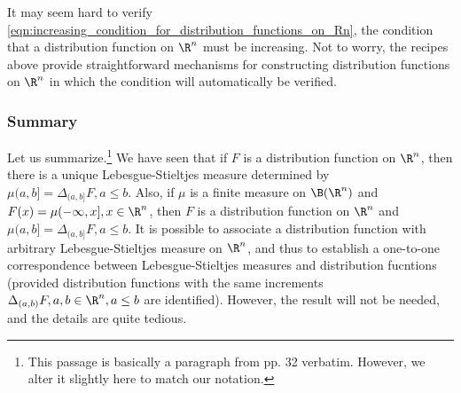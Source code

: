 \documentclass{article} %
\begin{document}

\begin{remark}

It may seem hard to verify \eqref{eqn:increasing_condition_for_distribution_functions_on_Rn}, the condition that a distribution function on $\R^n$ must be increasing.  Not to worry, the recipes above provide straightforward mechanisms for constructing distribution functions on $\R^n$ in which the condition will automatically be verified.
\end{remark}

\subsubsection{Summary}

Let us summarize.\footnote{This passage is basically a paragraph from \cite{ash2000probability} pp. 32 verbatim. However, we alter it slightly here to match our notation.} We have seen that if $F$ is a distribution function on $\R^n$, then there is a unique Lebesgue-Stieltjes measure determined by $\mu(a,b] = \Delta_{(a,b]} F, a \leq b$.  Also, if $\mu$ is a finite measure on $\B(\R^n)$ and $F(x) = \mu(-\infty, x], x \in \R^n$, then $F$ is a distribution function on $\R^n$ and $\mu(a,b] =  \Delta_{(a,b]} F, a \leq b$.   It is possible to associate a distribution function with arbitrary Lebesgue-Stieltjes measure on $\R^n$, and thus to establish a one-to-one correspondence between Lebesgue-Stieltjes measures and distribution fucntions (provided distribution functions with the same increments $\Delta_{(a,b)} F, a,b \in \R^n, a \leq b$ are identified).  However, the result will not be needed, and the details are quite tedious. 


\end{document}
